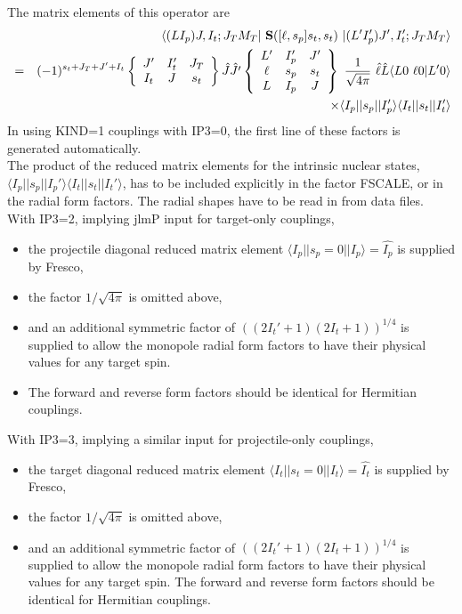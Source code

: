 \documentclass[11pt]{article}
\begin{document}
The  matrix elements of this operator are
\begin{eqnarray}
&& \langle(LI_p)J,I_t;J_TM_T | ~{\bf S}([\ell,s_p]s_t,s_t) ~| (L'I_p')J',I_t';J_TM_T \rangle
   \nonumber \\
& = &  (-1)^{s_t+J_T+J'+I_t}
   \left\{ \begin{array}{ccc}
    J'  & I_t' & J_T \\
    I_t & J    & s_t \\
    \end{array} \right\}   \hat{J} \hat{J'}
    \left\{ \begin{array}{ccc}
    L' & I_p' & J'  \\
    \ell & s_p & s_t  \\
    L & I_p & J  \\
    \end{array} \right\}  ~
     \frac{1}{\sqrt{4\pi}} ~ \hat{\ell} \hat{L} \langle L 0 \ \ell 0 | L'0 \rangle   \nonumber \\
    &  &   \times \langle I_p||s_p||I_p'\rangle \langle I_t||s_t||I_t'\rangle
\end{eqnarray}
In using KIND=1 couplings with IP3=0, the first line of these factors is generated automatically. \\
The product of the
reduced matrix elements for the intrinsic nuclear states,
$\langle I_p||s_p||I_p'\rangle \langle I_t||s_t||I_t'\rangle$,
 has to be included explicitly in the factor FSCALE,
 or in the radial form factors.
The radial shapes have to be read in from data files.\\

With IP3=2, implying jlmP input for target-only couplings,
\begin{itemize}
\item
 the projectile diagonal reduced matrix element
$\langle I_p||s_p=0||I_p\rangle = \hat{I_p}$ is supplied by Fresco,
\item
the factor $1/\sqrt{4\pi}$ is omitted above,
\item
and an additional symmetric factor of
$((2I_t'+1)(2I_t+1))^{1/4}$
is supplied to allow the
monopole radial form factors to have their physical
values for any target spin.
\item
The forward and reverse form factors should be identical for Hermitian couplings.

\end{itemize}
With IP3=3, implying a similar input for projectile-only couplings,
\begin{itemize}
\item
 the target diagonal reduced matrix element
 $\langle I_t||s_t=0||I_t\rangle = \hat{I_t}$ is supplied by Fresco,
 \item
 the factor $1/\sqrt{4\pi}$ is omitted above,
 \item
 and an additional symmetric factor of $((2I_t'+1)(2I_t+1))^{1/4}$
 is supplied to allow the monopole radial form factors to have their physical
 values for any target spin.
 The forward and reverse form factors should be identical for Hermitian couplings.
\end{itemize}
\end{document}
